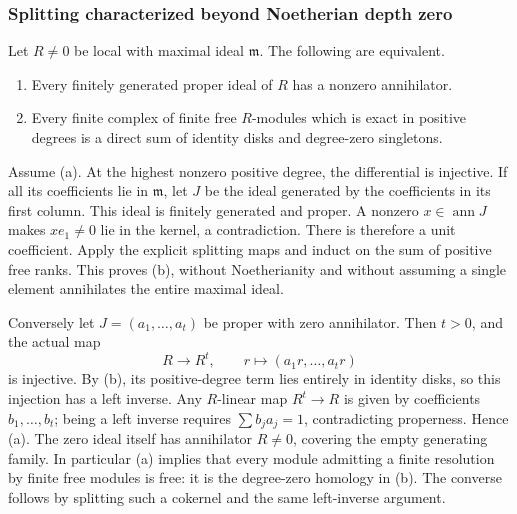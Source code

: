 \subsubsection{Splitting characterized beyond Noetherian depth zero}\label{algebra-proof-018-splitting-characterized-beyond-noetherian-depth-zero}

Let \(R\ne0\) be local with maximal ideal \(\mathfrak m\). The following are equivalent.

\begin{enumerate}
\def\labelenumi{(\alph{enumi})}
\item
  Every finitely generated proper ideal of \(R\) has a nonzero annihilator.
\item
  Every finite complex of finite free \(R\)-modules which is exact in positive degrees is a direct sum of identity disks and degree-zero singletons.
\end{enumerate}

Assume (a). At the highest nonzero positive degree, the differential is injective. If all its coefficients lie in \(\mathfrak m\), let \(J\) be the ideal generated by the coefficients in its first column. This ideal is finitely generated and proper. A nonzero \(x\in\operatorname{ann}J\) makes \(xe_1\ne0\) lie in the kernel, a contradiction. There is therefore a unit coefficient. Apply the explicit splitting maps and induct on the sum of positive free ranks. This proves (b), without Noetherianity and without assuming a single element annihilates the entire maximal ideal.

Conversely let \(J=(a_1,\ldots,a_t)\) be proper with zero annihilator. Then \(t>0\), and the actual map \[
 R\longrightarrow R^t,\qquad r\longmapsto(a_1r,\ldots,a_tr)
\] is injective. By (b), its positive-degree term lies entirely in identity disks, so this injection has a left inverse. Any \(R\)-linear map \(R^t\to R\) is given by coefficients \(b_1,\ldots,b_t\); being a left inverse requires \(\sum b_ja_j=1\), contradicting properness. Hence (a). The zero ideal itself has annihilator \(R\ne0\), covering the empty generating family. In particular (a) implies that every module admitting a finite resolution by finite free modules is free: it is the degree-zero homology in (b). The converse follows by splitting such a cokernel and the same left-inverse argument.

